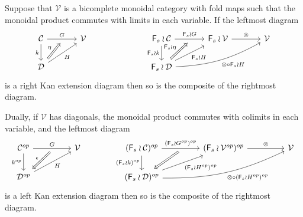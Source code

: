 \documentclass[a4paper,10pt]{article}%
\begin{document}
\begin{lemma}\label{FINWREATPRODLIM LEM}
Suppose that $\mathcal{V}$ is a bicomplete monoidal category with fold maps such that
the monoidal product %
commutes with limits in each variable. If the leftmost diagram
\begin{equation}\label{WRRAN EQ}
	\begin{tikzcd}[column sep = 3.5em]
	\mathcal{C} \ar{r}[swap,name=F]{}{G} \ar{d}[swap]{k} &
	\mathcal{V} & 
	& 
	\Fin_s \wr \mathcal{C} \ar{r}[swap,name=FF]{}{\Fin_s \wr G} \ar{d}[swap]{\Fin_s \wr k}&
	\Fin_s \wr \mathcal{V} \ar{r}{\otimes} &
	\mathcal{V}
		\\
	|[alias=D]|\mathcal{D} \ar{ru}[swap]{H} &
	& & 
	|[alias=FD]|\Fin_s \wr \mathcal{D} \ar{ru}[swap]{\Fin_s \wr H}
	\ar[bend right=13]{rru}[swap]{\otimes \circ \Fin_s \wr H}
	\arrow[Rightarrow, from=D, to=F,shorten <=0.10cm,"\eta"]
	\arrow[Rightarrow, from=FD, to=FF,shorten <=0.10cm,"\Fin_s \wr \eta"]
	\end{tikzcd}
\end{equation}
is a right Kan extension diagram then so is the composite of the rightmost diagram. 

Dually, if $\mathcal{V}$ has diagonals,
the monoidal product %
commutes with colimits in each variable, and the leftmost diagram
\begin{equation}\label{WRLAN EQ}
	\begin{tikzcd}[column sep = 4.5em]
	\mathcal{C}^{op} \ar{r}[swap,name=F]{}{G} \ar{d}[swap]{k^{op}} & 
	\mathcal{V} & 
	(\Fin_s \wr \mathcal{C})^{op} \ar{d}[swap]{(\Fin_s \wr k)^{op}} 
	\ar{r}[swap,name=FF]{}{(\Fin_s \wr G^{op})^{op}} & 
	(\Fin_s \wr \mathcal{V}^{op})^{op} \ar{r}{\otimes} &
	\mathcal{V}
\\
	|[alias=D]|\mathcal{D}^{op} \ar{ru}[swap]{H} &
	& 
	|[alias=FD]|(\Fin_s \wr \mathcal{D})^{op} 
	\ar{ru}[swap]{(\Fin_s \wr H^{op})^{op}}
	\ar[bend right=13]{rru}[swap]{\otimes \circ (\Fin_s \wr H^{op})^{op}}
	&
	\arrow[Leftarrow, from=D, to=F,shorten <=0.10cm,"\epsilon"]
	\arrow[Leftarrow, from=FD, to=FF,shorten <=0.10cm]
	\end{tikzcd}
\end{equation}
is a left Kan extension diagram then so is the composite of the rightmost diagram. 
\end{lemma}
\end{document}
